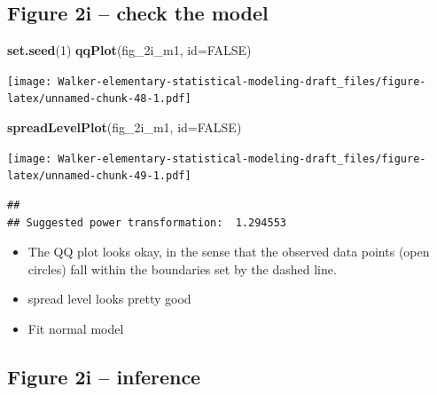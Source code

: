\documentclass[]{book}
\newenvironment{Shaded}{\begin{snugshade}}{\end{snugshade}}
\newcommand{\DataTypeTok}[1]{\textcolor[rgb]{0.13,0.29,0.53}{#1}}
\newcommand{\DecValTok}[1]{\textcolor[rgb]{0.00,0.00,0.81}{#1}}
\newcommand{\KeywordTok}[1]{\textcolor[rgb]{0.13,0.29,0.53}{\textbf{#1}}}
\newcommand{\NormalTok}[1]{#1}
\newcommand{\OtherTok}[1]{\textcolor[rgb]{0.56,0.35,0.01}{#1}}
\providecommand{\tightlist}{%
  \setlength{\itemsep}{0pt}\setlength{\parskip}{0pt}}
\begin{document}
\hypertarget{figure-2i-check-the-model}{%
\subsection{Figure 2i -- check the model}\label{figure-2i-check-the-model}}

\begin{Shaded}
\begin{Highlighting}[]
\KeywordTok{set.seed}\NormalTok{(}\DecValTok{1}\NormalTok{)}
\KeywordTok{qqPlot}\NormalTok{(fig_2i_m1, }\DataTypeTok{id=}\OtherTok{FALSE}\NormalTok{)}
\end{Highlighting}
\end{Shaded}

\texttt{[image: Walker-elementary-statistical-modeling-draft\_files/figure-latex/unnamed-chunk-48-1.pdf]}

\begin{Shaded}
\begin{Highlighting}[]
\KeywordTok{spreadLevelPlot}\NormalTok{(fig_2i_m1, }\DataTypeTok{id=}\OtherTok{FALSE}\NormalTok{)}
\end{Highlighting}
\end{Shaded}

\texttt{[image: Walker-elementary-statistical-modeling-draft\_files/figure-latex/unnamed-chunk-49-1.pdf]}

\begin{verbatim}
## 
## Suggested power transformation:  1.294553
\end{verbatim}

\begin{itemize}
\tightlist
\item
  The QQ plot looks okay, in the sense that the observed data points (open circles) fall within the boundaries set by the dashed line.
\item
  spread level looks pretty good
\item
  Fit normal model
\end{itemize}

\hypertarget{figure-2i-inference}{%
\subsection{Figure 2i -- inference}\label{figure-2i-inference}}
\end{document}
